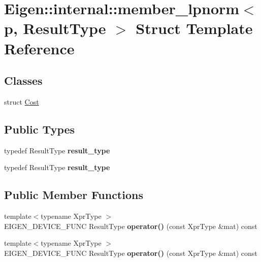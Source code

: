 \hypertarget{struct_eigen_1_1internal_1_1member__lpnorm}{}\section{Eigen\+:\+:internal\+:\+:member\+\_\+lpnorm$<$ p, Result\+Type $>$ Struct Template Reference}
\label{struct_eigen_1_1internal_1_1member__lpnorm}
\subsection*{Classes}
\begin{DoxyCompactItemize}
\item 
struct \hyperlink{struct_eigen_1_1internal_1_1member__lpnorm_1_1_cost}{Cost}
\end{DoxyCompactItemize}
\subsection*{Public Types}
\begin{DoxyCompactItemize}
\item 
\mbox{\label{struct_eigen_1_1internal_1_1member__lpnorm_ab6ab99afcf674586115a165609adb857}} 
typedef Result\+Type {\bfseries result\+\_\+type}
\item 
\mbox{\label{struct_eigen_1_1internal_1_1member__lpnorm_ab6ab99afcf674586115a165609adb857}} 
typedef Result\+Type {\bfseries result\+\_\+type}
\end{DoxyCompactItemize}
\subsection*{Public Member Functions}
\begin{DoxyCompactItemize}
\item 
\mbox{\label{struct_eigen_1_1internal_1_1member__lpnorm_a4bc521bdca340679548e376f50d3e766}} 
{\footnotesize template$<$typename Xpr\+Type $>$ }\\E\+I\+G\+E\+N\+\_\+\+D\+E\+V\+I\+C\+E\+\_\+\+F\+U\+NC Result\+Type {\bfseries operator()} (const Xpr\+Type \&mat) const
\item 
\mbox{\label{struct_eigen_1_1internal_1_1member__lpnorm_a4bc521bdca340679548e376f50d3e766}} 
{\footnotesize template$<$typename Xpr\+Type $>$ }\\E\+I\+G\+E\+N\+\_\+\+D\+E\+V\+I\+C\+E\+\_\+\+F\+U\+NC Result\+Type {\bfseries operator()} (const Xpr\+Type \&mat) const
\end{DoxyCompactItemize}


